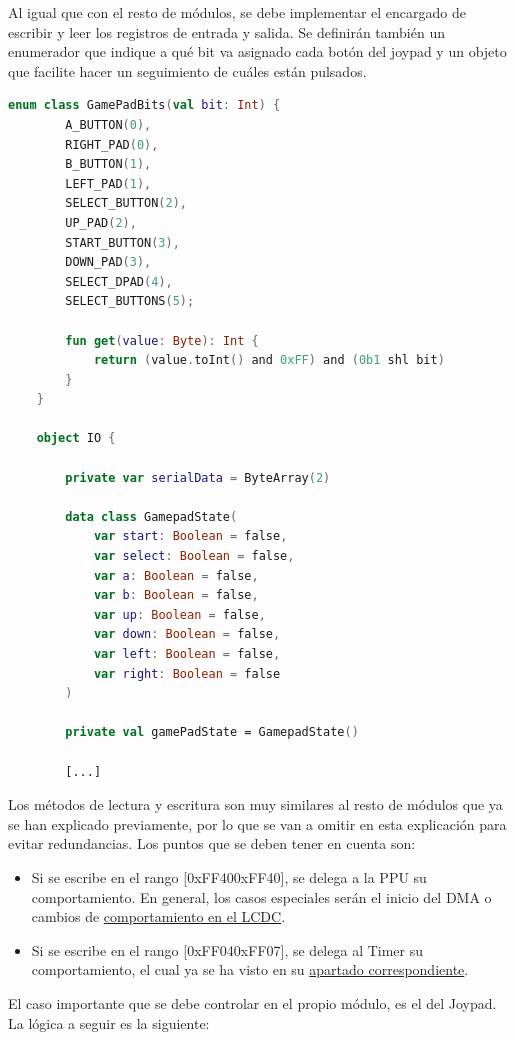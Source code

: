 Al igual que con el resto de módulos, se debe implementar el encargado de escribir y leer los registros de entrada y salida. Se definirán también un enumerador que indique a qué bit va asignado cada botón del joypad y un objeto que facilite hacer un seguimiento de cuáles están pulsados.

\begin{lstlisting}[language=Kotlin, caption={Estados de los Botones en el Módulo IO.}, label={code:iojoypad}]
    enum class GamePadBits(val bit: Int) {
        A_BUTTON(0),
        RIGHT_PAD(0),
        B_BUTTON(1),
        LEFT_PAD(1),
        SELECT_BUTTON(2),
        UP_PAD(2),
        START_BUTTON(3),
        DOWN_PAD(3),
        SELECT_DPAD(4),
        SELECT_BUTTONS(5);

        fun get(value: Byte): Int {
            return (value.toInt() and 0xFF) and (0b1 shl bit)
        }
    }

    object IO {

        private var serialData = ByteArray(2)

        data class GamepadState(
            var start: Boolean = false,
            var select: Boolean = false,
            var a: Boolean = false,
            var b: Boolean = false,
            var up: Boolean = false,
            var down: Boolean = false,
            var left: Boolean = false,
            var right: Boolean = false
        )

        private val gamePadState = GamepadState()

        [...]
\end{lstlisting}

Los métodos de lectura y escritura son muy similares al resto de módulos que ya se han explicado previamente, por lo que se van a omitir en esta explicación para evitar redundancias. Los puntos que se deben tener en cuenta son:

\begin{itemize}
    \item Si se escribe en el rango [0xFF40\-0xFF40], se delega a la PPU su comportamiento. En general, los casos especiales serán el inicio del DMA o cambios de \hyperref[handleLCDC]{comportamiento en el LCDC}.
    \item Si se escribe en el rango [0xFF04\-0xFF07], se delega al Timer su comportamiento, el cual ya se ha visto en su \hyperref[writeToTimer]{apartado correspondiente}.
\end{itemize}

El caso importante que se debe controlar en el propio módulo, es el del Joypad. La lógica a seguir es la siguiente:

